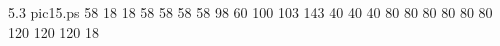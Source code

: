  5.3 pic15.ps 
{}{}{
 58 
 18 
 18 
 58 
 58 
 58 
 58 
 98 
 60 
 100 
 103 
 143 
 40 
 40 
 40 
 80 
 80 
 80 
 80 
 80 
 80 
 120 
 120 
 120 
 18 
}
